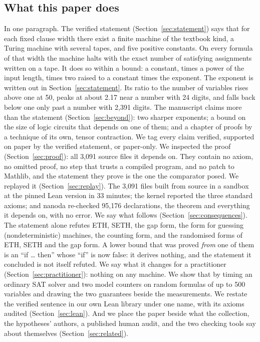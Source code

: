 \subsection{What this paper does}
\label{sec:intro-summary}

In one paragraph. The verified statement (Section~\ref{sec:statement})
says that for each fixed clause width there exist a finite machine of
the textbook kind, a Turing machine with several tapes, and five
positive constants. On every formula of that width the machine halts
with the exact number of satisfying assignments written on a tape. It
does so within a bound: a constant, times a power of the input length,
times two raised to a constant times the exponent. The exponent is
written out in Section~\ref{sec:statement}. Its ratio to the number of
variables rises above one at 50, peaks at about 2.17 near a number with
24 digits, and falls back below one only past a number with 2,391
digits. The manuscript claims more than the statement
(Section~\ref{sec:beyond}): two sharper exponents; a bound on the size
of logic circuits that depends on one of them; and a chapter of proofs
by a technique of its own, tensor contraction. We tag every claim
verified, supported on paper by the verified statement, or paper-only.
We inspected the proof (Section~\ref{sec:proof}): all 3,091 source
files it depends on. They contain no axiom, no omitted proof, no step
that trusts a compiled program, and no patch to Mathlib, and the
statement they prove is the one the comparator posed. We replayed it
(Section~\ref{sec:replay}). The 3,091 files built from source in a
sandbox at the pinned Lean version in 33 minutes; the kernel reported
the three standard axioms; and nanoda re-checked 95,176 declarations,
the theorem and everything it depends on, with no error. We say what
follows (Section~\ref{sec:consequences}). The statement alone refutes
ETH, SETH, the gap form, the form for guessing (nondeterministic)
machines, the counting form, and the randomised forms of ETH, SETH and
the gap form. A lower bound that was proved \emph{from} one of them is
an ``if \ldots{} then'' whose ``if'' is now false: it derives nothing,
and the statement it concluded is not itself refuted. We say what it
changes for a practitioner (Section~\ref{sec:practitioner}): nothing on
any machine. We show that by timing an ordinary SAT solver and two model
counters on random formulas of up to 500 variables and drawing the two
guarantees beside the measurements. We restate the verified sentence in
our own Lean library under one name, with its axioms audited
(Section~\ref{sec:lean}). And we place the paper beside what the
collection, the hypotheses' authors, a published human audit, and the
two checking tools say about themselves (Section~\ref{sec:related}).

